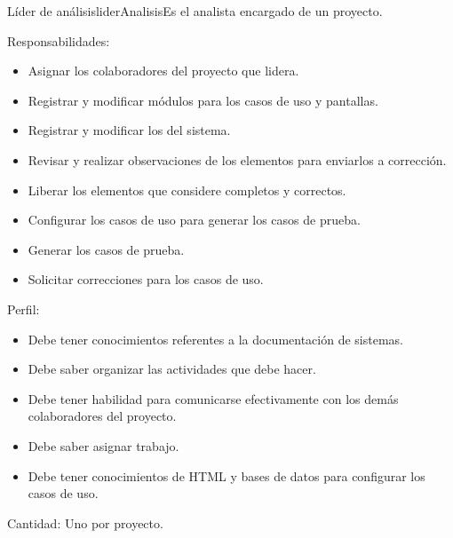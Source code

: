 \begin{actor}{Líder de análisis}{liderAnalisis}{Es el analista encargado de un proyecto.}
    \item[Responsabilidades:] \hspace{1pt}
    \begin{itemize}
	\item Asignar los colaboradores del proyecto que lidera.
	\item Registrar y modificar módulos para los casos de uso y pantallas.
	\item Registrar y modificar los  del sistema.
	\item Revisar y realizar observaciones de los elementos para enviarlos a corrección.
	\item Liberar los elementos que considere completos y correctos.
	\item Configurar los casos de uso para generar los casos de prueba.
	\item Generar los casos de prueba.
	\item Solicitar correcciones para los casos de uso.
    \end{itemize}
    \item[Perfil:] \hspace{1pt}
    \begin{itemize}
	\item Debe tener conocimientos referentes a la documentación de sistemas.
	\item Debe saber organizar las actividades que debe hacer.
	\item Debe tener habilidad para comunicarse efectivamente con los demás colaboradores del proyecto.
	\item Debe saber asignar trabajo.
	\item Debe tener conocimientos de HTML y bases de datos para configurar los casos de uso.
    \end{itemize}
    \item[Cantidad:] Uno por proyecto.
\end{actor}

